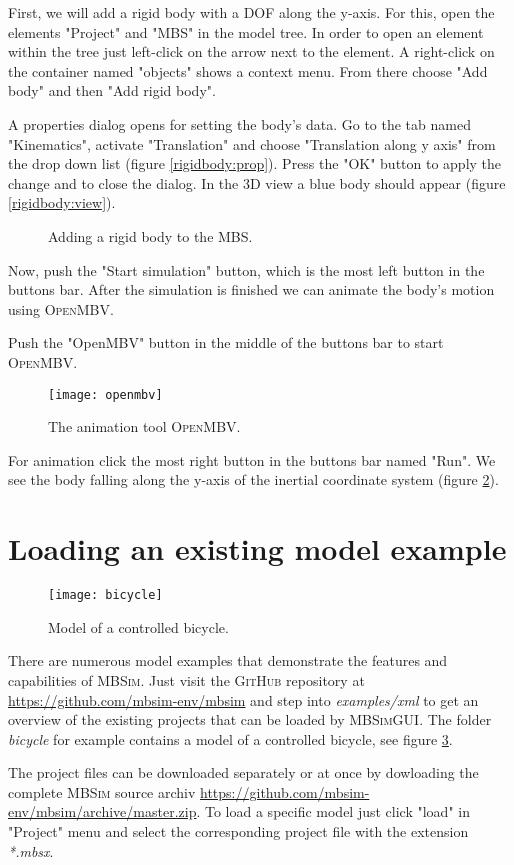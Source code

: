 \documentclass[
a4paper,
fleqn,
DIV=15,
pagesize
]{scrartcl}
\begin{document}
First, we will add a rigid body with a DOF along the {\color{green}y-axis}. For this,
open the elements "Project" and "MBS" in the model tree. In order to open an
element within the tree just left-click on the arrow next to the element.
A right-click on the container named "objects" shows a context menu. From there
choose "Add body" and then "Add rigid body".

A properties dialog opens for setting the body's data. Go to the tab named
"Kinematics", activate "Translation" and choose "Translation along y axis" from
the drop down list (figure \ref{rigidbody:prop}). Press the "OK" button to
apply the change and to close the dialog. In the 3D view a blue body should
appear (figure \ref{rigidbody:view}).
\begin{figure}
\centering
{}
\caption{Adding a rigid body to the MBS.} \label{rigidbody}
\end{figure}

Now, push the "Start simulation" button, which is the most left button in the
buttons bar. After the simulation is finished we can animate the body's
motion using \textsc{OpenMBV}.

Push the "OpenMBV" button in the middle of the buttons bar to start
\textsc{OpenMBV}.
\begin{figure}
\centering
\texttt{[image: openmbv]}
\caption{The animation tool \textsc{OpenMBV}.} \label{openmbv}
\end{figure}
For animation click
the most right button in the buttons bar named "Run". We see the body falling
along the {\color{green}y-axis} of the inertial coordinate system (figure
\ref{openmbv}).

\section{Loading an existing model example}

\begin{figure}
\centering
\texttt{[image: bicycle]}
\caption{Model of a controlled bicycle.} \label{bicycle}
\end{figure}
There are numerous model examples that demonstrate the features and capabilities of \textsc{MBSim}. Just visit the \textsc{GitHub} repository at \url{https://github.com/mbsim-env/mbsim} and step into \emph{examples/xml} to get an overview of the existing projects that can be loaded by \textsc{MBSimGUI}. The folder \emph{bicycle} for example contains a model of a controlled bicycle, see figure \ref{bicycle}.

The project files can be downloaded separately or at once by dowloading the complete \textsc{MBSim} source archiv \url{https://github.com/mbsim-env/mbsim/archive/master.zip}. To load a specific model just click "load" in "Project" menu and select the corresponding project file with the extension \emph{*.mbsx}.
\end{document}
